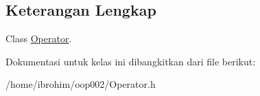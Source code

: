 \subsection{Keterangan Lengkap}
Class \hyperlink{classOperator}{Operator}. 

Dokumentasi untuk kelas ini dibangkitkan dari file berikut\+:\begin{DoxyCompactItemize}
\item 
/home/ibrohim/oop002/Operator.\+h\end{DoxyCompactItemize}
